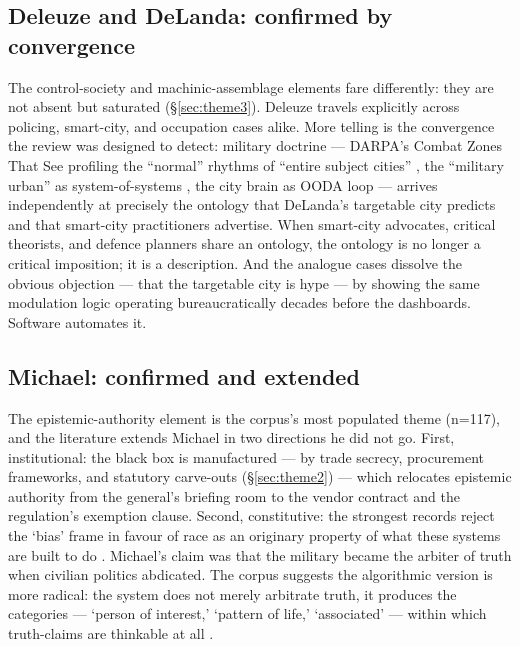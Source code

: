 \subsection{Deleuze and DeLanda: confirmed by convergence}

The control-society and machinic-assemblage elements fare differently: they are not absent but saturated (§\ref{sec:theme3}). Deleuze travels explicitly across policing, smart-city, and occupation cases alike. More telling is the convergence the review was designed to detect: military doctrine — DARPA's Combat Zones That See profiling the ``normal'' rhythms of ``entire subject cities'' \parencite[p.~35]{graham2008}, the ``military urban'' as system-of-systems \parencite[p.~406]{danielsson2025}, the city brain as OODA loop \parencite[pp.~3--4]{weber2023} — arrives independently at precisely the ontology that DeLanda's targetable city predicts and that smart-city practitioners advertise. When smart-city advocates, critical theorists, and defence planners share an ontology, the ontology is no longer a critical imposition; it is a description. And the analogue cases \parencite{coyles2017,crane2017} dissolve the obvious objection — that the targetable city is hype — by showing the same modulation logic operating bureaucratically decades before the dashboards. Software automates it.

\subsection{Michael: confirmed and extended}

The epistemic-authority element is the corpus's most populated theme (n=117), and the literature extends Michael in two directions he did not go. First, institutional: the black box is manufactured — by trade secrecy, procurement frameworks, and statutory carve-outs (§\ref{sec:theme2}) — which relocates epistemic authority from the general's briefing room to the vendor contract and the regulation's exemption clause. Second, constitutive: the strongest records reject the `bias' frame in favour of race as an originary property of what these systems are built to do \parencite{sharma2024,ziadah2021}. Michael's claim was that the military became the arbiter of truth when civilian politics abdicated. The corpus suggests the algorithmic version is more radical: the system does not merely arbitrate truth, it produces the categories — `person of interest,' `pattern of life,' `associated' — within which truth-claims are thinkable at all \parencite{amoore2009}.

